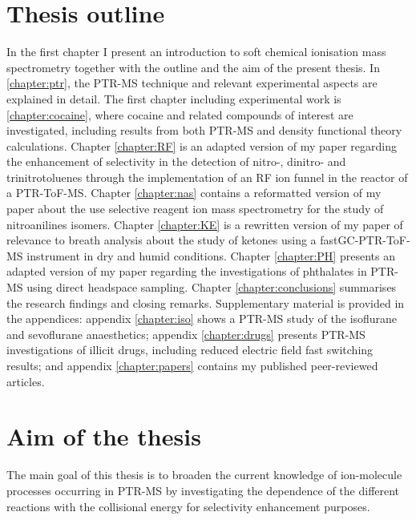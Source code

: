 \section{Thesis outline}
In the first chapter I present an introduction to soft chemical ionisation mass spectrometry together with the outline  and the aim of the present thesis.
%
%
In  \autoref{chapter:ptr}, the PTR-MS technique %
and relevant experimental aspects are explained in detail.
%
The first chapter including experimental work is \autoref{chapter:cocaine}, where cocaine and related compounds of interest are investigated, including results from both PTR-MS and density functional theory calculations.
%
%
Chapter \ref{chapter:RF} is an adapted version of my  paper regarding the enhancement of selectivity in the detection of nitro-, dinitro- and trinitrotoluenes %
through the implementation of an RF ion funnel in the reactor of a PTR-ToF-MS.
%
Chapter \ref{chapter:nas} contains a reformatted version of my  paper about the use selective reagent ion mass spectrometry for the study of nitroanilines isomers.
%
Chapter \ref{chapter:KE} is a rewritten version of my  paper of relevance to breath analysis about the study of ketones using a fastGC-PTR-ToF-MS instrument %
in dry and humid conditions.
%
Chapter \ref{chapter:PH} presents an adapted version of my  paper regarding the investigations of phthalates in PTR-MS using direct headspace sampling.
%
Chapter \ref{chapter:conclusions} summarises the research findings and closing remarks.
%
Supplementary material is provided in the appendices: 
appendix \ref{chapter:iso} shows a PTR-MS study of the  isoflurane and sevoflurane anaesthetics;
appendix \ref{chapter:drugs} presents  PTR-MS investigations of illicit drugs, including reduced electric field fast switching results;
and 
appendix \ref{chapter:papers} contains my published peer-reviewed articles.%






\section{Aim of the thesis}
The main goal of this thesis is to broaden the current knowledge of ion-molecule processes occurring in PTR-MS by investigating the dependence of the different reactions with the collisional energy for selectivity enhancement purposes.
%


